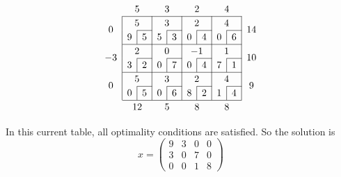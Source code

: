 \[
	\arraycolsep=5pt\def\arraystretch{1.2}
	\begin{array}{c|c|c|c|c|c|c|c|c|c}
		\multicolumn{1}{c}{}    & \multicolumn{2}{c}{5}  & \multicolumn{2}{c}{3}  & \multicolumn{2}{c}{2}   & \multicolumn{2}{c}{4}  & \multicolumn{1}{c}{}                                       \\\cline{2-9}
		\multirow{2}{*}{\(0\)}  & \multicolumn{2}{c|}{5} & \multicolumn{2}{c|}{3} & \multicolumn{2}{c|}{2}  & \multicolumn{2}{c|}{4} & \multirow{2}{*}{\(14\)}                                    \\\cline{3-3}\cline{5-5}\cline{7-7}\cline{9-9}
		                        & \multicolumn{1}{c|}{9} & 5                      & \multicolumn{1}{c|}{5}  & 3                      & \multicolumn{1}{c|}{0}  & 4 & \multicolumn{1}{c|}{0} & 6 & \\\cline{2-9}
		\multirow{2}{*}{\(-3\)} & \multicolumn{2}{c|}{2} & \multicolumn{2}{c|}{0} & \multicolumn{2}{c|}{-1} & \multicolumn{2}{c|}{1} & \multirow{2}{*}{\(10\)}                                    \\\cline{3-3}\cline{5-5}\cline{7-7}\cline{9-9}
		                        & \multicolumn{1}{c|}{3} & 2                      & \multicolumn{1}{c|}{0}  & 7                      & \multicolumn{1}{c|}{0}  & 4 & \multicolumn{1}{c|}{7} & 1 & \\\cline{2-9}
		\multirow{2}{*}{\(0\)}  & \multicolumn{2}{c|}{5} & \multicolumn{2}{c|}{3} & \multicolumn{2}{c|}{2}  & \multicolumn{2}{c|}{4} & \multirow{2}{*}{\(9\)}                                     \\\cline{3-3}\cline{5-5}\cline{7-7}\cline{9-9}
		                        & \multicolumn{1}{c|}{0} & 5                      & \multicolumn{1}{c|}{0}  & 6                      & \multicolumn{1}{c|}{8}  & 2 & \multicolumn{1}{c|}{1} & 4 & \\\cline{2-9}
		\multicolumn{1}{c}{}    & \multicolumn{2}{c}{12} & \multicolumn{2}{c}{5}  & \multicolumn{2}{c}{8}   & \multicolumn{2}{c}{8}  & \multicolumn{1}{c}{}
	\end{array}
\]

\noindent In this current table, all optimality conditions are satisfied.
So the solution is
\[
	x = \begin{pmatrix}
		9 & 3 & 0 & 0 \\
		3 & 0 & 7 & 0 \\
		0 & 0 & 1 & 8
	\end{pmatrix}
\]
